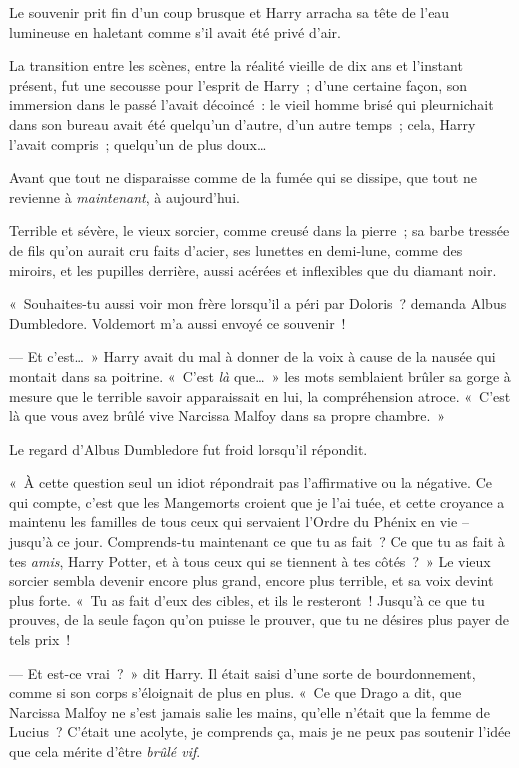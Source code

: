 \later

Le souvenir prit fin d'un coup brusque et Harry arracha sa tête de l'eau lumineuse en haletant comme s'il avait été privé d'air.

La transition entre les scènes, entre la réalité vieille de dix ans et l'instant présent, fut une secousse pour l'esprit de Harry~; d'une certaine façon, son immersion dans le passé l'avait décoincé~: le vieil homme brisé qui pleurnichait dans son bureau avait été quelqu'un d'autre, d'un autre temps~; cela, Harry l'avait compris~; quelqu'un de plus doux…

Avant que tout ne disparaisse comme de la fumée qui se dissipe, que tout ne revienne à \emph{maintenant}, à aujourd'hui.

Terrible et sévère, le vieux sorcier, comme creusé dans la pierre~; sa barbe tressée de fils qu'on aurait cru faits d'acier, ses lunettes en demi-lune, comme des miroirs, et les pupilles derrière, aussi acérées et inflexibles que du diamant noir.

«~Souhaites-tu aussi voir mon frère lorsqu'il a péri par Doloris~? demanda Albus Dumbledore.
Voldemort m'a aussi envoyé ce souvenir~!

--- Et c'est…~»
Harry avait du mal à donner de la voix à cause de la nausée qui montait dans sa poitrine.
«~C'est \emph{là} que…~»
les mots semblaient brûler sa gorge à mesure que le terrible savoir apparaissait en lui, la compréhension atroce.
«~C'est là que vous avez brûlé vive Narcissa Malfoy dans sa propre chambre.~»

Le regard d'Albus Dumbledore fut froid lorsqu'il répondit.

«~À cette question seul un idiot répondrait pas l'affirmative ou la négative.
Ce qui compte, c'est que les Mangemorts croient que je l'ai tuée, et cette croyance a maintenu les familles de tous ceux qui servaient l'Ordre du Phénix en vie -- jusqu'à ce jour.
Comprends-tu maintenant ce que tu as fait~?
Ce que tu as fait à tes \emph{amis}, Harry Potter, et à tous ceux qui se tiennent à tes côtés~?~»
Le vieux sorcier sembla devenir encore plus grand, encore plus terrible, et sa voix devint plus forte.
«~Tu as fait d'eux des cibles, et ils le resteront~!
Jusqu'à ce que tu prouves, de la seule façon qu'on puisse le prouver, que tu ne désires plus payer de tels prix~!

--- Et est-ce vrai~?~»
dit Harry.
Il était saisi d'une sorte de bourdonnement, comme si son corps s'éloignait de plus en plus.
«~Ce que Drago a dit, que Narcissa Malfoy ne s'est jamais salie les mains, qu'elle n'était que la femme de Lucius~?
C'était une acolyte, je comprends ça, mais je ne peux pas soutenir l'idée que cela mérite d'être \emph{brûlé vif}.

